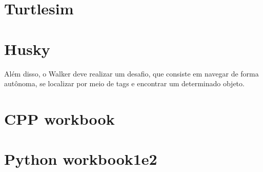  \section{Turtlesim}

 \section{Husky}
 Além disso, o Walker deve realizar um desafio, que consiste em navegar de forma autônoma, se localizar por meio de tags e encontrar um determinado objeto.
 \section{CPP workbook}
 \section{Python workbook1e2}






